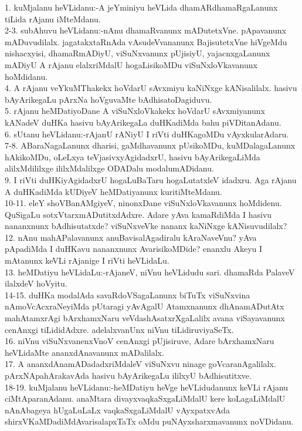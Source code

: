 \documentclass{article}
\begin{document}
1. kuMjalanu heVLidanu:-A jeYminiyu heVLida dhamARdhamaRgaLanunx tiLida rAjanu iMteMdanu.\\
2-3. subAhuvu heVLidanu:-nAnu dhamaRvanunx mADutetxVne. pApavanunx mADuvudilalx. jagatakxtaRnAda vAsudeVvananunx BajisutetxVne hiVgeMdu nishacxyisi, dhamaRmADiyU, viSuNxvanunx pUjisiyU, yajacnxgaLanunx mADiyU A rAjanu elalxriMdalU hogaLisikoMDu viSuNxloVkavanunx hoMdidanu.\\
4. A rAjanu veYkuMThakekx hoVdarU sAvxmiyu kaNiNxge kANisalilalx. hasivu bAyArikegaLu pArxNa hoVguvaMte bAdhisatoDagiduvu.\\
5. rAjanu heMDatiyoDane A viSuNxloVkakekx hoVdarU sAvxmiyanunx kANadeV duHKa hasivu bAyArikegaLa duHKadiMda bahu piVDitanAdanu.\\
6. sUtanu heVLidanu:-rAjanU rANiyU I riVti duHKagoMDu vAyxkularAdaru.\\
7-8. ABaraNagaLanunx dharisi, gaMdhavanunx pUsikoMDu, kuMDalagaLanunx hAkikoMDu, oLeLxya teVjasivxyAgidadxrU, hasivu bAyArikegaLiMda alilxMdililxge ililxMdalilxge ODADalu modalumADidanu.\\
9. I riVti duHKiyAgidadxrU hogaLuBaTaru hogaLutatxleV idadxru. Aga rAjanu A duHKadiMda kUDiyeV heMDatiyanunx kuritiMteMdanu.\\
10-11. eleY shoVBanAMgiyeV, ninonxDane viSuNxloVkavanunx hoMdidenu. QuSigaLu sotxVtarxmADutitxdAdxre. Adare yAva kamaRdiMda I hasivu nananxnunx bAdhisutatxde? viSuNxveVke nananx kaNiNxge kANisuvudilalx?\\
12. nAnu mahAPalavanunx anuBavisalAgadiralu kAraNaveVnu? yAva pApadiMda I duHKavu nananxnunx AvarisikoMDide? enanxlu Akeyu I mAtanunx keVLi rAjanige I riVti heVLidaLu.\\
13. heMDatiyu heVLidaLu:-rAjaneV, niVnu heVLidudu sari. dhamaRda PalaveV ilalxdeV hoVyitu.\\
14-15. duHKa modalAda savaRdoVSagaLanunx biTuTx viSuNxvina nAmoVcAcxraNeyiMda pUtaragi yAvAgalU Atamxnanunx dhAnamADutAtx mahAtamxrAgi bArxhamxNaru veVdashAsatxrXgaLalilx avana viSayavanunx cenAnxgi tiLididAdxre. adelalxvanUnx niVnu tiLidiruviyaSeTx.\\
16. niVnu viSuNxvanenxVnoV cenAnxgi pUjisiruve, Adare bArxhamxNaru heVLidaMte ananxdAnavanunx mADalilalx.\\
17. A ananxdAnamADadadxriMdaleV viSuNxvu ninage  goVcaranAgalilalx. pArxNApahArakavAda hasivu bAyArikegaLu ililxyU bAdhisutitxve.\\
18-19. kuMjalanu heVLidanu:-heMDatiyu heVge heVLidudanunx keVLi rAjanu ciMtAparanAdanu. anaMtara divayxvaqkaSxgaLiMdalU kere koLagaLiMdalU nAnAbageya hUgaLuLaLx vaqkaSxgaLiMdalU vAyxpatxvAda shirxVKaMDadiMdAvarisalapxTaTx oMdu puNAyxsharxmavanunx noVDidanu.\\
\end{document}
